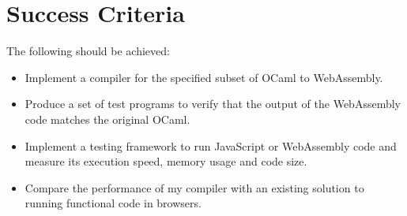 \documentclass[12pt]{article}
\begin{document}

\section*{Success Criteria}

The following should be achieved:

\begin{itemize}

\item Implement a compiler for the specified subset of OCaml to WebAssembly.

\item Produce a set of test programs to verify that the output of the WebAssembly code matches the original OCaml.

\item Implement a testing framework to run JavaScript or WebAssembly code and measure its execution speed, memory usage and code size.


\item Compare the performance of my compiler with an existing solution to running functional code in browsers.


\end{itemize}
\end{document}

